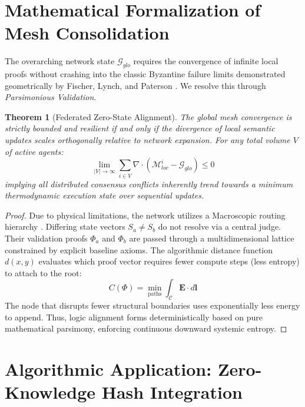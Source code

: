 \documentclass[12pt, a4paper]{article}
\theoremstyle{plain}
\newtheorem{theorem}{Theorem}[section]
\theoremstyle{definition}
\begin{document}
\section{Mathematical Formalization of Mesh Consolidation}
The overarching network state $\mathcal{G}_{glo}$ requires the convergence of infinite local proofs without crashing into the classic Byzantine failure limits demonstrated geometrically by Fischer, Lynch, and Paterson \cite{fischer1985impossibility}. We resolve this through \textit{Parsimonious Validation}.

\begin{theorem} [Federated Zero-State Alignment]
The global mesh convergence is strictly bounded and resilient if and only if the divergence of local semantic updates scales orthogonally relative to network expansion. For any total volume $V$ of active agents:
\begin{equation}
    \lim_{|V| \to \infty} \sum_{i \in V} \nabla \cdot \left(\mathcal{M}_{loc}^i - \mathcal{G}_{glo}\right) \leq 0
\end{equation}
implying all distributed consensus conflicts inherently trend towards a minimum thermodynamic execution state over sequential updates.
\end{theorem}
\begin{proof}
Due to physical limitations, the network utilizes a Macroscopic routing hierarchy \cite{awerbuch1992macroscopic}. Differing state vectors $S_a \neq S_b$ do not resolve via a central judge. Their validation proofs $\Phi_a$ and $\Phi_b$ are passed through a multidimensional lattice constrained by explicit baseline axioms. The algorithmic distance function $d(x, y)$ evaluates which proof vector requires fewer compute steps (less entropy) to attach to the root:
\begin{equation}
    C(\Phi) = \min_{\text{paths}} \int_{\mathcal{C}} \mathbf{E} \cdot d\mathbf{l}
\end{equation}
The node that disrupts fewer structural boundaries uses exponentially less energy to append. Thus, logic alignment forms deterministically based on pure mathematical parsimony, enforcing continuous downward systemic entropy.
\end{proof}

\section{Algorithmic Application: Zero-Knowledge Hash Integration}
\end{document}
